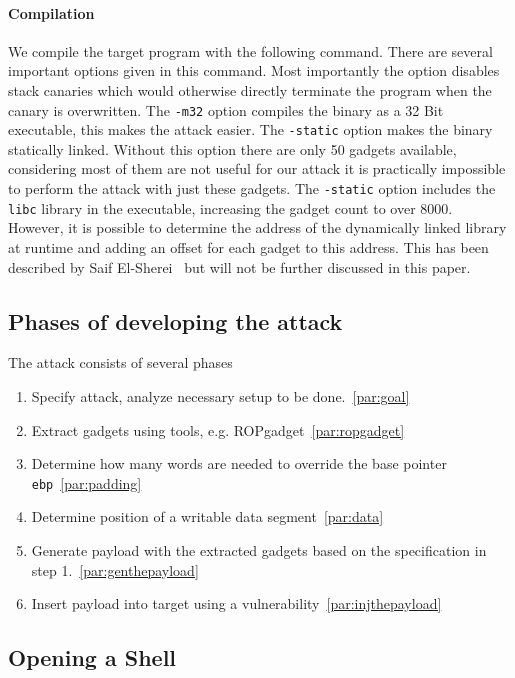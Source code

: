\documentclass[journal=tosc,submission, notanonymous]{iacrtrans}
\begin{document}
\paragraph{Compilation}
We compile the target program with the following command. There are several important options given in this command. Most importantly the  option disables stack canaries which would otherwise directly terminate the program when the canary is overwritten. The \Verb+-m32+ option compiles the binary as a 32 Bit executable, this makes the attack easier. The \Verb+-static+ option makes the binary statically linked. Without this option there are only 50 gadgets available, considering most of them are not useful for our attack it is practically impossible to perform the attack with just these gadgets. The \Verb+-static+ option includes the \Verb+libc+ library in the executable, increasing the gadget count to over 8000. However, it is possible to determine the address of the dynamically linked library at runtime and adding an offset for each gadget to this address. This has been described by Saif El-Sherei~\cite{el-sherei} but will not be further discussed in this paper.
\subsection{Phases of developing the attack}
The attack consists of several phases
\begin{enumerate}
  \item Specify attack, analyze necessary setup to be done.~\cref{par:goal}
  \item Extract gadgets using tools, e.g. ROPgadget~\cref{par:ropgadget}
  \item Determine how many words are needed to override the base pointer \Verb+ebp+~\cref{par:padding}
  \item Determine position of a writable data segment~\cref{par:data}
  \item Generate payload with the extracted gadgets based on the specification in step 1.~\cref{par:genthepayload}
  \item Insert payload into target using a vulnerability~\cref{par:injthepayload}
\end{enumerate}
\subsection{Opening a Shell}
\end{document}

